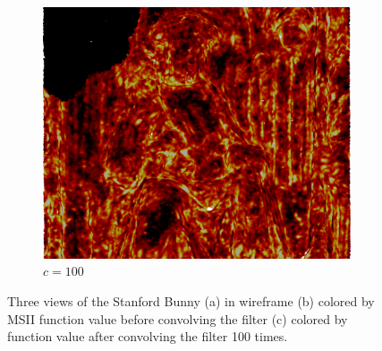 \begin{figure}[ht]
\begin{subfigure}[b]{0.32\linewidth}
		\includegraphics[width=\linewidth]
		{data/acquired_meshes/unisiegel_100iter.png}
		\caption{$c=100$}\label{fig:bun.c}
	\end{subfigure}
	\caption[Three views of the Stanford Bunny]{Three views of the Stanford Bunny (a) in wireframe (b) colored by MSII function value before convolving the filter (c) colored by function value after convolving the filter 100 times.}
	\label{fig:bun}
\end{figure}
\todoCitation{}
